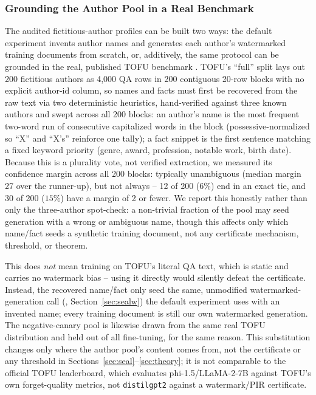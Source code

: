 \documentclass[10pt,journal,compsoc]{IEEEtran}
\begin{document}
\subsubsection{Grounding the Author Pool in a Real Benchmark}
\label{sec:tofu-grounding}

The audited fictitious-author profiles can be built two ways: the default experiment invents author names and generates each author's watermarked training documents from scratch, or, additively, the same protocol can be grounded in the real, published TOFU benchmark \cite{maini2024tofu}. TOFU's ``full'' split lays out 200 fictitious authors as 4{,}000 QA rows in 200 contiguous 20-row blocks with no explicit author-id column, so names and facts must first be recovered from the raw text via two deterministic heuristics, hand-verified against three known authors and swept across all 200 blocks: an author's name is the most frequent two-word run of consecutive capitalized words in the block (possessive-normalized so ``X'' and ``X's'' reinforce one tally); a fact snippet is the first sentence matching a fixed keyword priority (genre, award, profession, notable work, birth date). Because this is a plurality vote, not verified extraction, we measured its confidence margin across all 200 blocks: typically unambiguous (median margin 27 over the runner-up), but not always -- 12 of 200 ($6\%$) end in an exact tie, and 30 of 200 ($15\%$) have a margin of 2 or fewer. We report this honestly rather than only the three-author spot-check: a non-trivial fraction of the pool may seed generation with a wrong or ambiguous name, though this affects only which name/fact seeds a synthetic training document, not any certificate mechanism, threshold, or theorem.

This does \emph{not} mean training on TOFU's literal QA text, which is static and carries no watermark bias -- using it directly would silently defeat the certificate. Instead, the recovered name/fact only seed the same, unmodified watermarked-generation call (\cite{kirchenbauer2023watermark}, Section~\ref{sec:sealw}) the default experiment uses with an invented name; every training document is still our own watermarked generation. The negative-canary pool is likewise drawn from the same real TOFU distribution and held out of all fine-tuning, for the same reason. This substitution changes only where the author pool's content comes from, not the certificate or any threshold in Sections~\ref{sec:seal}--\ref{sec:theory}; it is not comparable to the official TOFU leaderboard, which evaluates phi-1.5/LLaMA-2-7B against TOFU's own forget-quality metrics, not \texttt{distilgpt2} against a watermark/PIR certificate.
\end{document}
